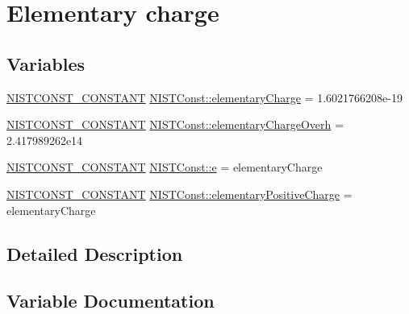 \hypertarget{group___n_i_s_t_const-_elementary_charge}{}\section{Elementary charge}
\label{group___n_i_s_t_const-_elementary_charge}
\subsection*{Variables}
\begin{DoxyCompactItemize}
\item 
\mbox{\hyperlink{group___n_i_s_t_const-_macros_ga2b0fc1d7452373f816175dd86ce26729}{N\+I\+S\+T\+C\+O\+N\+S\+T\+\_\+\+C\+O\+N\+S\+T\+A\+NT}} \mbox{\hyperlink{group___n_i_s_t_const-_elementary_charge_ga8685ffddeaed87687d2ee0539b4625de}{N\+I\+S\+T\+Const\+::elementary\+Charge}} = 1.\+6021766208e-\/19
\item 
\mbox{\hyperlink{group___n_i_s_t_const-_macros_ga2b0fc1d7452373f816175dd86ce26729}{N\+I\+S\+T\+C\+O\+N\+S\+T\+\_\+\+C\+O\+N\+S\+T\+A\+NT}} \mbox{\hyperlink{group___n_i_s_t_const-_elementary_charge_gae14d69d686990378677cd8072ce9873b}{N\+I\+S\+T\+Const\+::elementary\+Charge\+Overh}} = 2.\+417989262e14
\item 
\mbox{\hyperlink{group___n_i_s_t_const-_macros_ga2b0fc1d7452373f816175dd86ce26729}{N\+I\+S\+T\+C\+O\+N\+S\+T\+\_\+\+C\+O\+N\+S\+T\+A\+NT}} \mbox{\hyperlink{group___n_i_s_t_const-_elementary_charge_ga08631567d9c0fcbc9b51078b88f82f1a}{N\+I\+S\+T\+Const\+::e}} = elementary\+Charge
\item 
\mbox{\hyperlink{group___n_i_s_t_const-_macros_ga2b0fc1d7452373f816175dd86ce26729}{N\+I\+S\+T\+C\+O\+N\+S\+T\+\_\+\+C\+O\+N\+S\+T\+A\+NT}} \mbox{\hyperlink{group___n_i_s_t_const-_elementary_charge_ga59f7decf2a69240cb8ed498000bfb8a2}{N\+I\+S\+T\+Const\+::elementary\+Positive\+Charge}} = elementary\+Charge
\end{DoxyCompactItemize}


\subsection{Detailed Description}


\subsection{Variable Documentation}
\mbox{\label{group___n_i_s_t_const-_elementary_charge_ga08631567d9c0fcbc9b51078b88f82f1a}} 
